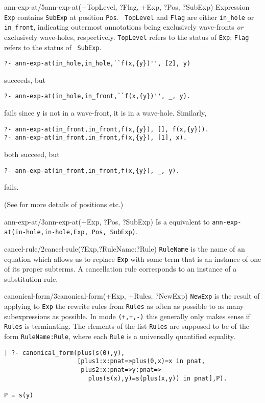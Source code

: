 \begin{predicate}{ann-exp-at/5}{ann-exp-at(+TopLevel, ?Flag, +Exp, ?Pos, ?SubExp)}%
Expression {\tt Exp} contains {\tt SubExp} at position {\tt Pos}. {\tt
TopLevel} and {\tt Flag} are either {\tt in\_hole} or {\tt in\_front},
indicating outermost annotations being exclusively wave-fronts {\em
or\/} exclusively wave-holes, respectively.  {\tt TopLevel} refers to
the status of {\tt Exp}; {\tt Flag} refers to the status of {\tt
SubExp}.

\begin{verbatim}
?- ann-exp-at(in_hole,in_hole,``f(x,{y})'', [2], y)
\end{verbatim}
succeeds, but
\begin{verbatim}
?- ann-exp-at(in_hole,in_front,``f(x,{y})'', _, y).
\end{verbatim}
fails since {\tt y} is not in a wave-front, it is in a wave-hole.
Similarly,
\begin{verbatim}
?- ann-exp-at(in_front,in_front,f(x,{y}), [], f(x,{y})).  
?- ann-exp-at(in_front,in_front,f(x,{y}), [1], x).
\end{verbatim}
both succeed, but
\begin{verbatim}
?- ann-exp-at(in_front,in_front,f(x,{y}), _, y).
\end{verbatim}
fails.

(See  for more details of positions etc.)
\end{predicate}

\begin{predicate}{ann-exp-at/3}{ann-exp-at(+Exp, ?Pos, ?SubExp)}%
Is a equivalent to {\tt ann-exp-at(in-hole,in-hole,Exp, Pos, SubExp)}.
\end{predicate}

\begin{predicate}{cancel-rule/2}{cancel-rule(?Exp,?RuleName:?Rule)}%
{\tt RuleName} is the name of an equation which allows us to replace
{\tt Exp} with some term that is an instance of one of its proper
subterms. A cancellation rule corresponds to an instance of a
substitution rule.
\end{predicate}

\begin{predicate}{canonical-form/3}{canonical-form(+Exp, +Rules, ?NewExp)}%
{\tt NewExp} is the result of applying to {\tt Exp} the rewrite rules
from {\tt Rules} as often as possible to as many subexpressions as
possible.  In mode {\tt (+,+,-)} this generally  only makes sense if
{\tt Rules} is terminating.
The elements of the list {\tt Rules} are supposed to be of the form
{\tt RuleName:Rule}, where each {\tt Rule} is a universally quantified
equality.

\begin{ex}
{\small\begin{verbatim}
| ?- canonical_form(plus(s(0),y),
                    [plus1:x:pnat=>plus(0,x)=x in pnat,
                     plus2:x:pnat=>y:pnat=>
                       plus(s(x),y)=s(plus(x,y)) in pnat],P).

P = s(y)
\end{verbatim}
}
\end{ex}
\end{predicate}

